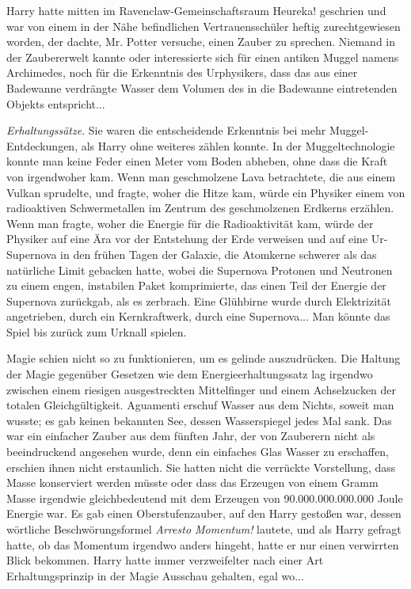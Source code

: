 Harry hatte mitten im Ravenclaw-Gemeinschaftsraum \glqq{}Heureka!\grqq{}
geschrien und war von einem in der Nähe befindlichen Vertrauensschüler heftig
zurechtgewiesen worden, der dachte, Mr. Potter versuche, einen Zauber zu
sprechen. Niemand in der Zaubererwelt kannte oder interessierte sich für einen
antiken Muggel namens Archimedes, noch für die Erkenntnis des Urphysikers, dass
das aus einer Badewanne verdrängte Wasser dem Volumen des in die Badewanne
eintretenden Objekts entspricht...

\emph{Erhaltungssätze}. Sie waren die entscheidende Erkenntnis bei mehr
Muggel-Entdeckungen, als Harry ohne weiteres zählen konnte. In der
Muggeltechnologie konnte man keine Feder einen Meter vom Boden abheben, ohne
dass die Kraft von irgendwoher kam. Wenn man geschmolzene Lava betrachtete, die
aus einem Vulkan sprudelte, und fragte, woher die Hitze kam, würde ein Physiker
einem von radioaktiven Schwermetallen im Zentrum des geschmolzenen Erdkerns
erzählen. Wenn man fragte, woher die Energie für die Radioaktivität kam, würde
der Physiker auf eine Ära vor der Entstehung der Erde verweisen und auf eine
Ur-Supernova in den frühen Tagen der Galaxie, die Atomkerne schwerer als das
natürliche Limit gebacken hatte, wobei die Supernova Protonen und Neutronen zu
einem engen, instabilen Paket komprimierte, das einen Teil der Energie der
Supernova zurückgab, als es zerbrach. Eine Glühbirne wurde durch Elektrizität
angetrieben, durch ein Kernkraftwerk, durch eine Supernova... Man könnte das
Spiel bis zurück zum Urknall spielen.

Magie schien nicht so zu funktionieren, um es gelinde auszudrücken. Die Haltung
der Magie gegenüber Gesetzen wie dem Energieerhaltungssatz lag irgendwo zwischen
einem riesigen ausgestreckten Mittelfinger und einem Achselzucken der totalen
Gleichgültigkeit. Aguamenti erschuf Wasser aus dem Nichts, soweit man wusste; es
gab keinen bekannten See, dessen Wasserspiegel jedes Mal sank. Das war ein
einfacher Zauber aus dem fünften Jahr, der von Zauberern nicht als beeindruckend
angesehen wurde, denn ein einfaches Glas Wasser zu erschaffen, erschien ihnen
nicht erstaunlich. Sie hatten nicht die verrückte Vorstellung, dass Masse
konserviert werden müsste oder dass das Erzeugen von einem Gramm Masse irgendwie
gleichbedeutend mit dem Erzeugen von 90.000.000.000.000 Joule Energie war. Es
gab einen Oberstufenzauber, auf den Harry gestoßen war, dessen wörtliche
Beschwörungsformel \glqq{}\emph{Arresto Momentum!}\grqq{} lautete, und als Harry
gefragt hatte, ob das Momentum irgendwo anders hingeht, hatte er nur einen
verwirrten Blick bekommen. Harry hatte immer verzweifelter nach einer Art
Erhaltungsprinzip in der Magie Ausschau gehalten, egal wo...

